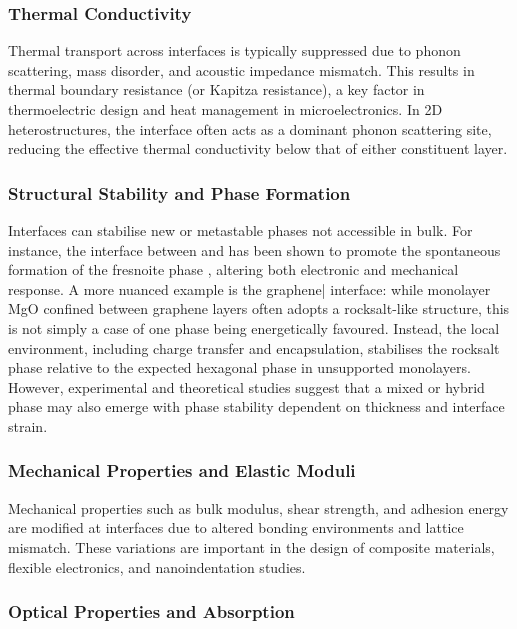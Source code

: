 \subsubsection{Thermal Conductivity}

Thermal transport across interfaces is typically suppressed due to phonon scattering, mass disorder, and acoustic impedance mismatch. This results in thermal boundary resistance (or Kapitza resistance), a key factor in thermoelectric design and heat management in microelectronics. In 2D heterostructures, the interface often acts as a dominant phonon scattering site, reducing the effective thermal conductivity below that of either constituent layer.

\subsubsection{Structural Stability and Phase Formation}

Interfaces can stabilise new or metastable phases not accessible in bulk. For instance, the interface between  and  has been shown to promote the spontaneous formation of the fresnoite phase , altering both electronic and mechanical response. A more nuanced example is the graphene| interface: while monolayer MgO confined between graphene layers often adopts a rocksalt-like structure, this is not simply a case of one phase being energetically favoured. Instead, the local environment, including charge transfer and encapsulation, stabilises the rocksalt phase relative to the expected hexagonal phase in unsupported monolayers. However, experimental and theoretical studies suggest that a mixed or hybrid phase may also emerge with phase stability dependent on thickness and interface strain.

\subsubsection{Mechanical Properties and Elastic Moduli}

Mechanical properties such as bulk modulus, shear strength, and adhesion energy are modified at interfaces due to altered bonding environments and lattice mismatch. These variations are important in the design of composite materials, flexible electronics, and nanoindentation studies.

\subsubsection{Optical Properties and Absorption}

